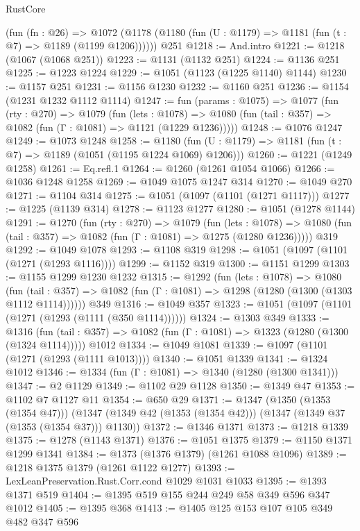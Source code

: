 \begin{lexlean}{RustCore}
\begin{coremodule}
    (fun (fn : @26) =>
    @1072 (@1178 (@1180 (fun (U : @1179) => @1181 (fun (t : @7) => @1189 (@1199 @1206))))))
    @251
@1218 := And.intro
@1221 := @1218 (@1067 (@1068 @251))
@1223 := @1131 (@1132 @251)
@1224 := @1136 @251
@1225 := @1223 @1224
@1229 := @1051 (@1123 (@1225 @1140) @1144)
@1230 := @1157 @251
@1231 := @1156 @1230
@1232 := @1160 @251
@1236 := @1154 (@1231 @1232 @1112 @1114)
@1247 := fun (params : @1075) =>
  @1077
    (fun (rty : @270) =>
    @1079
      (fun (lets : @1078) =>
      @1080 (fun (tail : @357) => @1082 (fun (Γ : @1081) => @1121 (@1229 @1236)))))
@1248 := @1076 @1247
@1249 := @1073 @1248
@1258 := @1180 (fun (U : @1179) => @1181 (fun (t : @7) => @1189 (@1051 (@1195 @1224 @1069) @1206)))
@1260 := @1221 (@1249 @1258)
@1261 := Eq.refl.{1}
@1264 := @1260 (@1261 @1054 @1066)
@1266 := @1036 @1248 @1258
@1269 := @1049 @1075 @1247 @314
@1270 := @1049 @270
@1271 := @1104 @314
@1275 := @1051 (@1097 (@1101 (@1271 @1117)))
@1277 := @1225 (@1139 @314)
@1278 := @1123 @1277
@1280 := @1051 (@1278 @1144)
@1291 := @1270
    (fun (rty : @270) =>
    @1079
      (fun (lets : @1078) =>
      @1080 (fun (tail : @357) => @1082 (fun (Γ : @1081) => @1275 (@1280 @1236)))))
    @319
@1292 := @1049 @1078
@1293 := @1108 @319
@1298 := @1051 (@1097 (@1101 (@1271 (@1293 @1116))))
@1299 := @1152 @319
@1300 := @1151 @1299
@1303 := @1155 @1299 @1230 @1232
@1315 := @1292
    (fun (lets : @1078) =>
    @1080
      (fun (tail : @357) => @1082 (fun (Γ : @1081) => @1298 (@1280 (@1300 (@1303 @1112 @1114))))))
    @349
@1316 := @1049 @357
@1323 := @1051 (@1097 (@1101 (@1271 (@1293 (@1111 (@350 @1114))))))
@1324 := @1303 @349
@1333 := @1316
    (fun (tail : @357) => @1082 (fun (Γ : @1081) => @1323 (@1280 (@1300 (@1324 @1114)))))
    @1012
@1334 := @1049 @1081
@1339 := @1097 (@1101 (@1271 (@1293 (@1111 @1013))))
@1340 := @1051 @1339
@1341 := @1324 @1012
@1346 := @1334 (fun (Γ : @1081) => @1340 (@1280 (@1300 @1341)))
@1347 := @2 @1129
@1349 := @1102 @29 @1128
@1350 := @1349 @47
@1353 := @1102 @7 @1127 @11
@1354 := @650 @29
@1371 := @1347
    (@1350 (@1353 (@1354 @47)))
    (@1347 (@1349 @42 (@1353 (@1354 @42))) (@1347 (@1349 @37 (@1353 (@1354 @37))) @1130))
@1372 := @1346 @1371
@1373 := @1218 @1339
@1375 := @1278 (@1143 @1371)
@1376 := @1051 @1375
@1379 := @1150 @1371 @1299 @1341
@1384 := @1373 (@1376 @1379) (@1261 @1088 @1096)
@1389 := @1218 @1375 @1379 (@1261 @1122 @1277)
@1393 := LexLeanPreservation.Rust.Corr.cond @1029 @1031 @1033
@1395 := @1393 @1371 @519
@1404 := @1395 @519 @155 @244 @249 @58 @349 @596 @347 @1012
@1405 := @1395 @368
@1413 := @1405 @125 @153 @107 @105 @349 @482 @347 @596

\end{coremodule}
\end{lexlean}
